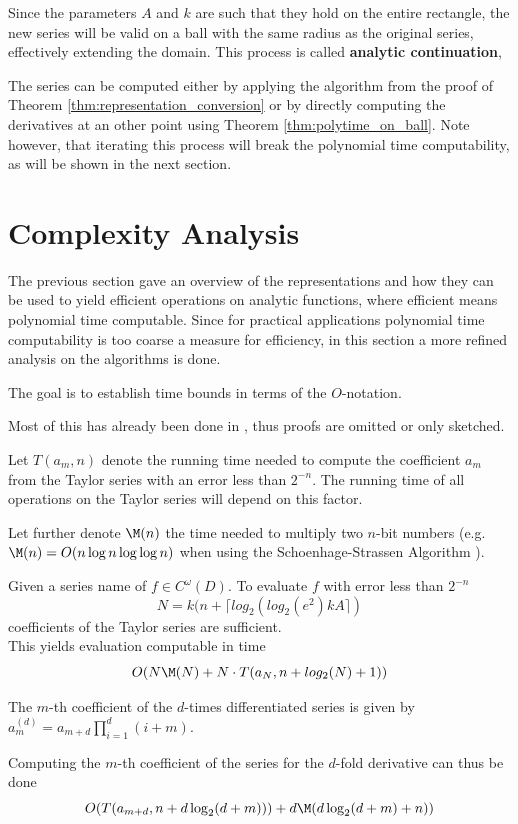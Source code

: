 		Since the parameters $A$ and $k$ are such that they hold on the entire rectangle, 
		the new series will be valid on a ball with the same radius as the original series, effectively extending the domain.
		This process is called \textbf{analytic continuation},
		
		The series can be computed either by applying the algorithm from the proof of Theorem \ref{thm:representation_conversion} or by directly computing the derivatives at an other point using Theorem \ref{thm:polytime_on_ball}.
		Note however, that iterating this process will break the polynomial time computability, as will be shown in the next
		section.
	\section{Complexity Analysis}
		The previous section gave an overview of the representations and how they can be used to yield efficient 
		operations on analytic functions, where efficient means polynomial time computable.
		Since for practical applications polynomial time computability is too coarse a measure for efficiency, 
		in this section a more refined analysis on the algorithms is done. 

		The goal is to establish time bounds in terms of the $O$-notation.
		
		Most of this has already been done in \cite{mypaper}, thus proofs are omitted or only sketched.

		Let $T(a_m, n)$ denote the running time needed to compute the coefficient $a_m$ from the Taylor series with an error 
		less than $2^{-n}$.
		The running time of all operations on the Taylor series will depend on this factor.

		Let further denote $\M(n)$ the time needed to multiply two $n$-bit numbers (e.g. $\M(n) = O(n\log n \log \log n)$ when using the Schoenhage-Strassen Algorithm \cite{sstr}). 		
		\begin{theorem}
			Given a series name of $f \in C^\omega(D)$.
			To evaluate $f$ with error less than $2^{-n}$ 
			$$N = k(n+\lceil log_2(log_2 (e^2) kA \rceil)$$
			coefficients of the Taylor series are sufficient. \\
			This yields evaluation computable in time 
			$$ O(N\M(N)+N \cdot T(a_N, n+log_2(N)+1)) $$ 
		\end{theorem}

		\begin{theorem}
			The $m$-th coefficient of the $d$-times differentiated series is given by $a_m^{(d)} = a_{m+d} \prod_{i=1}^d (i+m)$.
			
			Computing the $m$-th coefficient of the series for the $d$-fold derivative can thus be done
			$$ O(T(a_{m+d}, n+d\log_2(d+m)))+d\M(d \log_2 (d+m)+n)) $$
		\end{theorem}

